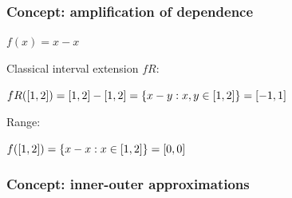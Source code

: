 \documentclass{beamer}
\begin{document}
\begin{frame}
    \frametitle{Concept: amplification of dependence}

    $f(x) = x - x$

    \vspace{7mm}
    Classical interval extension $fR$: \par
    $fR([1,2]) = [1, 2] - [1, 2] = \left\{x - y : x,y \in [1, 2]\right\} = [-1, 1]$

    \vspace{7mm}
    Range: \par
    $f([1,2]) = \left\{x - x : x \in [1, 2]\right\} = [0, 0]$

\end{frame}

\begin{frame}
    \frametitle{Concept: inner-outer approximations}


\end{frame}
\end{document}
